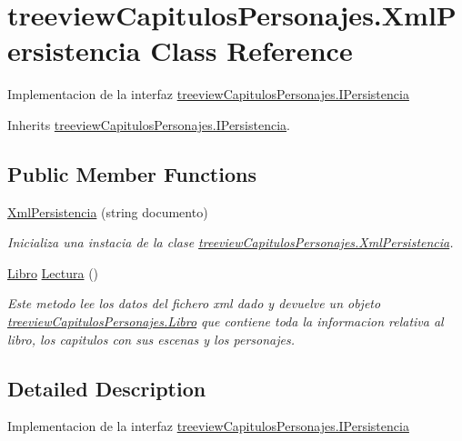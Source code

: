 \hypertarget{classtreeview_capitulos_personajes_1_1_xml_persistencia}{\section{treeview\-Capitulos\-Personajes.\-Xml\-Persistencia Class Reference}
\label{classtreeview_capitulos_personajes_1_1_xml_persistencia}
}


Implementacion de la interfaz \hyperlink{interfacetreeview_capitulos_personajes_1_1_i_persistencia}{treeview\-Capitulos\-Personajes.\-I\-Persistencia}  




Inherits \hyperlink{interfacetreeview_capitulos_personajes_1_1_i_persistencia}{treeview\-Capitulos\-Personajes.\-I\-Persistencia}.

\subsection*{Public Member Functions}
\begin{DoxyCompactItemize}
\item 
\hyperlink{classtreeview_capitulos_personajes_1_1_xml_persistencia_af975b7dae5edaa01574ca84af6b64634}{Xml\-Persistencia} (string documento)
\begin{DoxyCompactList}\small\item\em Inicializa una instacia de la clase \hyperlink{classtreeview_capitulos_personajes_1_1_xml_persistencia}{treeview\-Capitulos\-Personajes.\-Xml\-Persistencia}. \end{DoxyCompactList}\item 
\hyperlink{classtreeview_capitulos_personajes_1_1_libro}{Libro} \hyperlink{classtreeview_capitulos_personajes_1_1_xml_persistencia_a483b876111eda2a3d5f913ba8f3cfc28}{Lectura} ()
\begin{DoxyCompactList}\small\item\em Este metodo lee los datos del fichero xml dado y devuelve un objeto \hyperlink{classtreeview_capitulos_personajes_1_1_libro}{treeview\-Capitulos\-Personajes.\-Libro} que contiene toda la informacion relativa al libro, los capitulos con sus escenas y los personajes. \end{DoxyCompactList}\end{DoxyCompactItemize}


\subsection{Detailed Description}
Implementacion de la interfaz \hyperlink{interfacetreeview_capitulos_personajes_1_1_i_persistencia}{treeview\-Capitulos\-Personajes.\-I\-Persistencia} 



